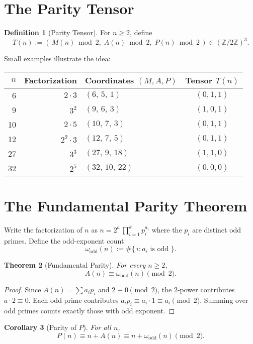 \documentclass[11pt,a4paper]{article}
\numberwithin{equation}{section}
\numberwithin{figure}{section}
\numberwithin{table}{section}
\theoremstyle{plain}
\newtheorem{theorem}{Theorem}[section]
\newtheorem{corollary}[theorem]{Corollary}
\theoremstyle{definition}
\newtheorem{definition}[theorem]{Definition}
\theoremstyle{remark}
\newcommand{\Z}{\mathbb{Z}}
\begin{document}
\section{The Parity Tensor}
\begin{definition}[Parity Tensor]
For \(n\ge 2\), define
\[
T(n) := (\,M(n) \bmod 2,\; A(n) \bmod 2,\; P(n) \bmod 2\,) \in (\Z/2\Z)^3.
\]
\end{definition}

Small examples illustrate the idea:
\begin{center}
\begin{tabular}{r r l c}
\toprule
\(n\) & Factorization & Coordinates \((M,A,P)\) & Tensor \(T(n)\) \\
\midrule
6  & \(2\cdot 3\)   & \((6,\,5,\,1)\)  & \((0,1,1)\) \\
9  & \(3^2\)        & \((9,\,6,\,3)\)  & \((1,0,1)\) \\
10 & \(2\cdot 5\)   & \((10,\,7,\,3)\) & \((0,1,1)\) \\
12 & \(2^2\cdot 3\) & \((12,\,7,\,5)\) & \((0,1,1)\) \\
27 & \(3^3\)        & \((27,\,9,\,18)\) & \((1,1,0)\) \\
32 & \(2^5\)        & \((32,\,10,\,22)\) & \((0,0,0)\) \\
\bottomrule
\end{tabular}
\end{center}

\section{The Fundamental Parity Theorem}
Write the factorization of \(n\) as \(n=2^a\,\prod_{i=1}^k p_i^{a_i}\) where the \(p_i\) are distinct odd primes. Define the odd-exponent count
\[
\omega_{\mathrm{odd}}(n) := \#\{\,i : a_i \text{ is odd }\}.
\]

\begin{theorem}[Fundamental Parity]\label{thm:fund-parity}
For every \(n\ge 2\),
\[
A(n) \equiv \omega_{\mathrm{odd}}(n) \pmod 2.
\]
\end{theorem}
\begin{proof}
Since \(A(n)=\sum a_i p_i\) and \(2\equiv 0\pmod 2\), the \(2\)-power contributes \(a\cdot 2\equiv 0\). Each odd prime contributes \(a_i p_i\equiv a_i\cdot 1\equiv a_i\pmod 2\). Summing over odd primes counts exactly those with odd exponent.
\end{proof}

\begin{corollary}[Parity of \(P\)]
For all \(n\),
\[
P(n) \equiv n + A(n) \equiv n + \omega_{\mathrm{odd}}(n) \pmod 2.
\]
\end{corollary}
\end{document}
